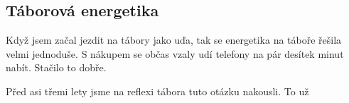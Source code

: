\subsection{Táborová energetika} %
\label{sub:táborová_energetika}

Když jsem začal jezdit na tábory jako uďa, tak se energetika na táboře řešila velmi jednoduše. S nákupem se občas vzaly udí telefony na pár desítek minut nabít. Stačilo to dobře.

Před asi třemi lety jsme na reflexi tábora tuto otázku nakousli. To už 



